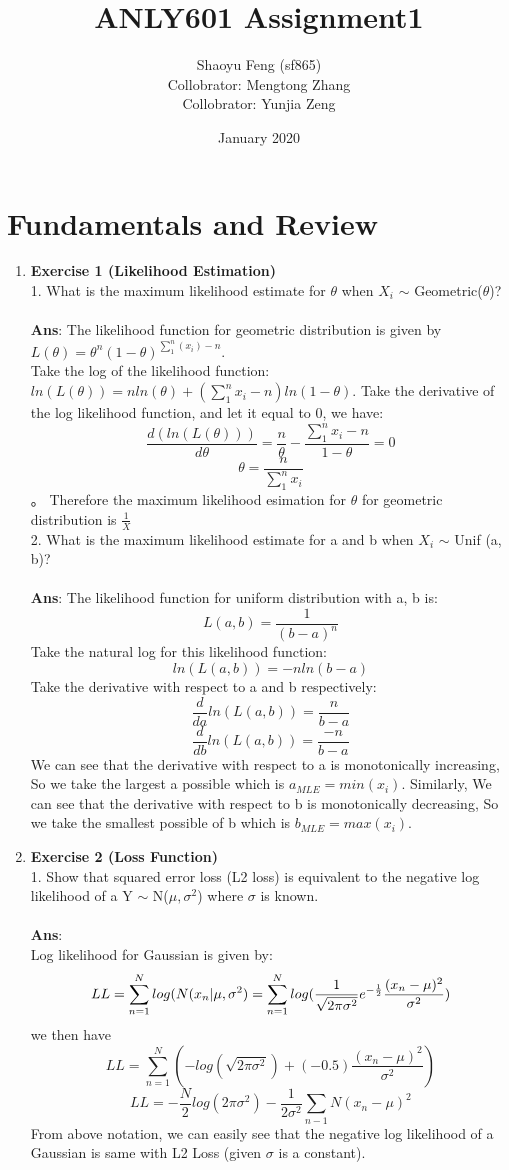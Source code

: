 \documentclass{article}
\title{ANLY601 Assignment1}
\author{Shaoyu Feng (sf865) \\
Collobrator: Mengtong Zhang \\
Collobrator: Yunjia Zeng 
}
\date{January 2020}
\begin{document}
\maketitle

\section{Fundamentals and Review}
\begin{enumerate}
\item \textbf{Exercise 1 (Likelihood Estimation)} \\
1. What is the maximum likelihood estimate for $\theta$ when $X_i$  $\sim$  Geometric($\theta$)? \\ \\ 
\textbf{Ans}:
The likelihood function for geometric distribution is given by $L(\theta)=\theta^n(1-\theta)^{\sum_1^n(x_i)-n}$.\\
Take the log of the likelihood function: $ln(L(\theta))=nln(\theta)+(\sum_1^n x_i-n)ln(1-\theta)$. 
Take the derivative of the log likelihood function, and let it equal to 0, we have: 
$$\frac{d(ln(L(\theta)))}{d\theta}=\frac{n}{\theta}-\frac{\sum_1^n x_i-n}{1-
\theta}=0$$
$$\theta=\frac{n}{\sum_1^n x_i}$$。 
Therefore the maximum likelihood esimation for $\theta$ for geometric distribution is $\frac{1}{X}$ \\

2. What is the maximum likelihood estimate for a and b when $X_i$ $\sim$ Unif (a, b)? \\ \\ 
\textbf{Ans}:
The likelihood function for uniform distribution with a, b is: 
$$ L(a,b)=\frac{1}{(b-a)^n}$$ 
Take the natural log for this likelihood function: 
$$ln(L(a,b))=-nln(b-a)$$
Take the derivative with respect to a and b respectively: 
$$\frac{d}{da}ln(L(a,b))=\frac{n}{b-a}$$
$$\frac{d}{db}ln(L(a,b))=\frac{-n}{b-a}$$ 
We can see that the derivative with respect to a is monotonically increasing, So we take the largest a possible which is $a_{MLE}=min(x_i)$. Similarly, We can see that the derivative with respect to b is monotonically decreasing, So we take the smallest possible of b which is $b_{MLE}=max(x_i)$.\\

\item \textbf{Exercise 2 (Loss Function)} \\

1. Show that squared error loss (L2 loss) is equivalent to the negative log likelihood of a Y $\sim$ N($\mu,\sigma^2$) where $\sigma$ is known. \\ \\ 
\textbf{Ans}: \\
Log likelihood for Gaussian is given  by: 
$$
LL=\sum_{n=1}^Nlog(N(x_n|\mu,\sigma^2) \\
=\sum_{n=1}^Nlog(\frac{1}{\sqrt{2\pi\sigma^2}}e^{-\frac{1}{2}}\frac{(x_n-\mu)^2}{\sigma^2})
$$
we then have 
$$
LL=\sum_{n=1}^N(-log(\sqrt{2\pi\sigma^2}) + (-0.5)\frac{(x_n-\mu)^2}{\sigma^2})
$$
$$
LL=-\frac{N}{2}log(2\pi\sigma^2)-\frac{1}{2\sigma^2}\sum_{n-1}{N}(x_n-\mu)^2
$$
From above notation, we can easily see that the negative log likelihood of a Gaussian is same with L2 Loss (given $\sigma$ is a constant).


\end{enumerate}
\end{document}
